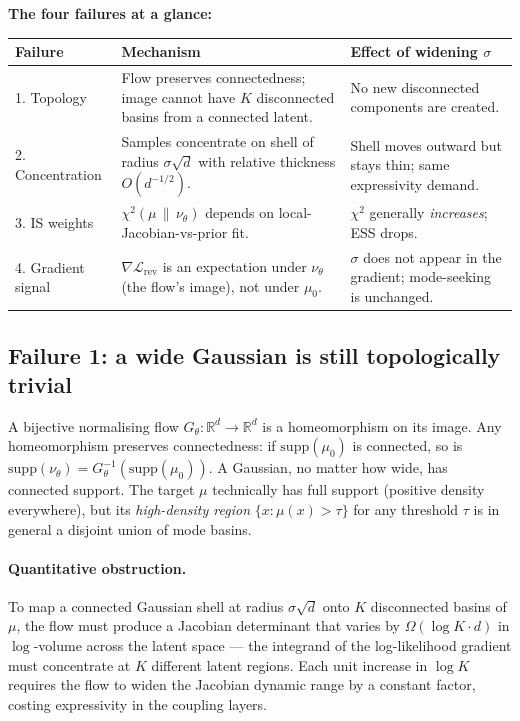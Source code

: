 \documentclass[11pt,letterpaper]{article}
\newcommand{\Real}{\mathbb{R}}
\theoremstyle{plain}
\begin{document}
\noindent\textbf{The four failures at a glance:}
\begin{center}
\small
\begin{tabular}{@{}p{3.4cm}p{5.0cm}p{5.0cm}@{}}
\toprule
\textbf{Failure} & \textbf{Mechanism} & \textbf{Effect of widening $\sigma$} \\
\midrule
1. Topology & Flow preserves connectedness; image cannot have $K$ disconnected basins from a connected latent. & No new disconnected components are created. \\
2. Concentration & Samples concentrate on shell of radius $\sigma\sqrt d$ with relative thickness $O(d^{-1/2})$. & Shell moves outward but stays thin; same expressivity demand. \\
3. IS weights & $\chi^2(\mu\,\|\,\nu_\theta)$ depends on local-Jacobian-vs-prior fit. & $\chi^2$ generally \emph{increases}; ESS drops. \\
4. Gradient signal & $\nabla\mathcal L_{\mathrm{rev}}$ is an expectation under $\nu_\theta$ (the flow's image), not under $\mu_0$. & $\sigma$ does not appear in the gradient; mode-seeking is unchanged. \\
\bottomrule
\end{tabular}
\end{center}

\medskip

\subsection{Failure 1: a wide Gaussian is still topologically trivial}

A bijective normalising flow $G_\theta:\Real^d\to\Real^d$ is a homeomorphism
on its image. Any homeomorphism preserves connectedness: if
$\mathrm{supp}(\mu_0)$ is connected, so is $\mathrm{supp}(\nu_\theta) =
G^{-1}_\theta(\mathrm{supp}(\mu_0))$. A Gaussian, no matter how wide, has
connected support. The target $\mu$ technically has full support (positive
density everywhere), but its \emph{high-density region}
$\{x : \mu(x) > \tau\}$ for any threshold $\tau$ is in general a disjoint
union of mode basins.

\paragraph{Quantitative obstruction.} To map a connected Gaussian shell at
radius $\sigma\sqrt{d}$ onto $K$ disconnected basins of $\mu$, the flow must
produce a Jacobian determinant that varies by $\Omega(\log K \cdot d)$ in
$\log$-volume across the latent space --- the integrand of the log-likelihood
gradient must concentrate at $K$ different latent regions. Each unit increase
in $\log K$ requires the flow to widen the Jacobian dynamic range by a
constant factor, costing expressivity in the coupling layers.
\end{document}
